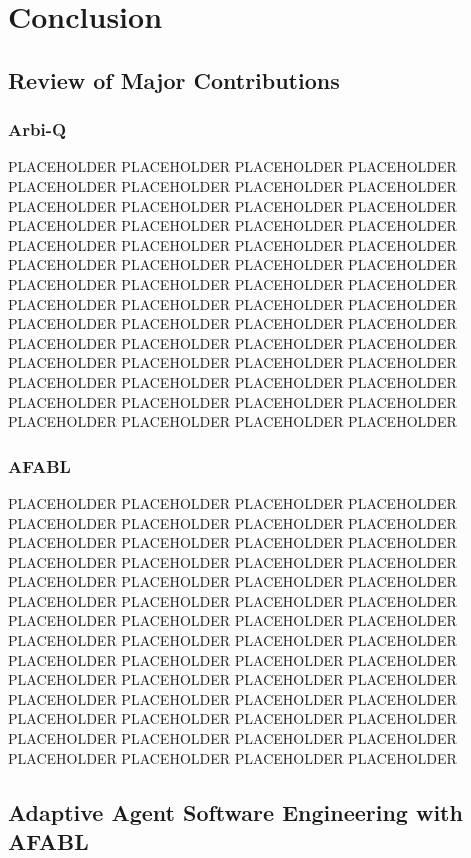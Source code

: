 \chapter{Conclusion}\label{ch:conclusion}

\section{Review of Major Contributions}

\subsection{Arbi-Q}

PLACEHOLDER PLACEHOLDER PLACEHOLDER PLACEHOLDER PLACEHOLDER PLACEHOLDER PLACEHOLDER PLACEHOLDER PLACEHOLDER PLACEHOLDER PLACEHOLDER PLACEHOLDER PLACEHOLDER PLACEHOLDER PLACEHOLDER PLACEHOLDER PLACEHOLDER PLACEHOLDER PLACEHOLDER PLACEHOLDER PLACEHOLDER PLACEHOLDER PLACEHOLDER PLACEHOLDER PLACEHOLDER PLACEHOLDER PLACEHOLDER PLACEHOLDER PLACEHOLDER PLACEHOLDER PLACEHOLDER PLACEHOLDER PLACEHOLDER PLACEHOLDER PLACEHOLDER PLACEHOLDER PLACEHOLDER PLACEHOLDER PLACEHOLDER PLACEHOLDER PLACEHOLDER PLACEHOLDER PLACEHOLDER PLACEHOLDER PLACEHOLDER PLACEHOLDER PLACEHOLDER PLACEHOLDER PLACEHOLDER PLACEHOLDER PLACEHOLDER PLACEHOLDER PLACEHOLDER PLACEHOLDER PLACEHOLDER PLACEHOLDER

\subsection{AFABL}

PLACEHOLDER PLACEHOLDER PLACEHOLDER PLACEHOLDER PLACEHOLDER PLACEHOLDER PLACEHOLDER PLACEHOLDER PLACEHOLDER PLACEHOLDER PLACEHOLDER PLACEHOLDER PLACEHOLDER PLACEHOLDER PLACEHOLDER PLACEHOLDER PLACEHOLDER PLACEHOLDER PLACEHOLDER PLACEHOLDER PLACEHOLDER PLACEHOLDER PLACEHOLDER PLACEHOLDER PLACEHOLDER PLACEHOLDER PLACEHOLDER PLACEHOLDER PLACEHOLDER PLACEHOLDER PLACEHOLDER PLACEHOLDER PLACEHOLDER PLACEHOLDER PLACEHOLDER PLACEHOLDER PLACEHOLDER PLACEHOLDER PLACEHOLDER PLACEHOLDER PLACEHOLDER PLACEHOLDER PLACEHOLDER PLACEHOLDER PLACEHOLDER PLACEHOLDER PLACEHOLDER PLACEHOLDER PLACEHOLDER PLACEHOLDER PLACEHOLDER PLACEHOLDER PLACEHOLDER PLACEHOLDER PLACEHOLDER PLACEHOLDER

\section{Adaptive Agent Software Engineering with AFABL}

